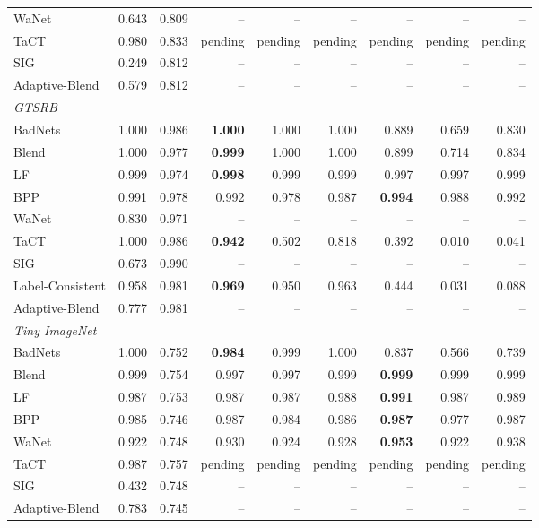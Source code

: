\begin{table}[htbp]
\begin{tabular}{lrrrrrrrr}
WaNet & 0.643 & 0.809 & -- & -- & -- & -- & -- & -- \\
TaCT & 0.980 & 0.833 & pending & pending & pending & pending & pending & pending \\
SIG & 0.249 & 0.812 & -- & -- & -- & -- & -- & -- \\
Adaptive-Blend & 0.579 & 0.812 & -- & -- & -- & -- & -- & -- \\
\midrule
\multicolumn{9}{l}{\textit{GTSRB}} \\
BadNets & 1.000 & 0.986 & \textbf{1.000} & 1.000 & 1.000 & 0.889 & 0.659 & 0.830 \\
Blend & 1.000 & 0.977 & \textbf{0.999} & 1.000 & 1.000 & 0.899 & 0.714 & 0.834 \\
LF & 0.999 & 0.974 & \textbf{0.998} & 0.999 & 0.999 & 0.997 & 0.997 & 0.999 \\
BPP & 0.991 & 0.978 & 0.992 & 0.978 & 0.987 & \textbf{0.994} & 0.988 & 0.992 \\
WaNet & 0.830 & 0.971 & -- & -- & -- & -- & -- & -- \\
TaCT & 1.000 & 0.986 & \textbf{0.942} & 0.502 & 0.818 & 0.392 & 0.010 & 0.041 \\
SIG & 0.673 & 0.990 & -- & -- & -- & -- & -- & -- \\
Label-Consistent & 0.958 & 0.981 & \textbf{0.969} & 0.950 & 0.963 & 0.444 & 0.031 & 0.088 \\
Adaptive-Blend & 0.777 & 0.981 & -- & -- & -- & -- & -- & -- \\
\midrule
\multicolumn{9}{l}{\textit{Tiny ImageNet}} \\
BadNets & 1.000 & 0.752 & \textbf{0.984} & 0.999 & 1.000 & 0.837 & 0.566 & 0.739 \\
Blend & 0.999 & 0.754 & 0.997 & 0.997 & 0.999 & \textbf{0.999} & 0.999 & 0.999 \\
LF & 0.987 & 0.753 & 0.987 & 0.987 & 0.988 & \textbf{0.991} & 0.987 & 0.989 \\
BPP & 0.985 & 0.746 & 0.987 & 0.984 & 0.986 & \textbf{0.987} & 0.977 & 0.987 \\
WaNet & 0.922 & 0.748 & 0.930 & 0.924 & 0.928 & \textbf{0.953} & 0.922 & 0.938 \\
TaCT & 0.987 & 0.757 & pending & pending & pending & pending & pending & pending \\
SIG & 0.432 & 0.748 & -- & -- & -- & -- & -- & -- \\
Adaptive-Blend & 0.783 & 0.745 & -- & -- & -- & -- & -- & -- \\
\bottomrule
\end{tabular}
\end{table}
